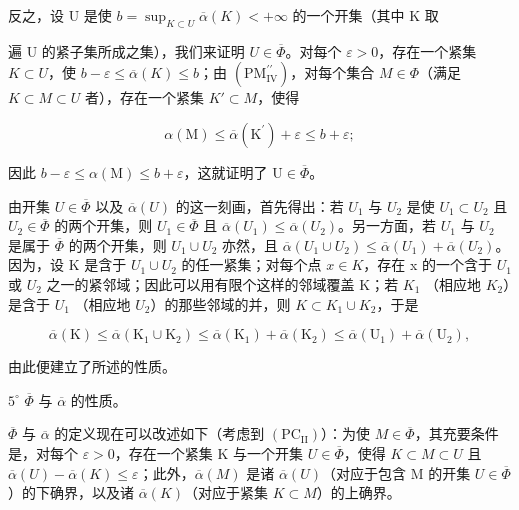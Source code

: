 反之，设 U 是使 \(b = \sup_{K \subset U} \overline{\alpha}(K) < +\infty\) 的一个开集（其中 K 取

遍 U 的紧子集所成之集），我们来证明 \(U \in \overline{\Phi}\)。对每个 \(\varepsilon > 0\)，存在一个紧集 \(K \subset U\)，使 \(b - \varepsilon \leqslant \overline{\alpha}(K) \leqslant b\)；由 \((\mathrm{PM}_{\mathrm{IV}}^{\prime\prime})\)，对每个集合 \(M \in \Phi\)（满足 \(K \subset M \subset U\) 者），存在一个紧集 \(K' \subset M\)，使得

\[
\alpha (\mathrm{M}) \leqslant \overline {{{{\alpha}}}} (\mathrm{K} ^ {\prime}) + \varepsilon \leqslant b + \varepsilon ;
\]

因此 \(b - \varepsilon \leqslant \alpha (\mathrm{M}) \leqslant b + \varepsilon\)，这就证明了 \(\mathrm{U} \in \overline{\Phi}\)。

由开集 \(U \in \overline{\Phi}\) 以及 \(\overline{\alpha}(U)\) 的这一刻画，首先得出：若 \(U_{1}\) 与 \(U_{2}\) 是使 \(U_{1} \subset U_{2}\) 且 \(U_{2} \in \overline{\Phi}\) 的两个开集，则 \(U_{1} \in \overline{\Phi}\) 且 \(\overline{\alpha}(U_{1}) \leqslant \overline{\alpha}(U_{2})\)。另一方面，若 \(U_{1}\) 与 \(U_{2}\) 是属于 \(\overline{\Phi}\) 的两个开集，则 \(U_{1} \cup U_{2}\) 亦然，且 \(\overline{\alpha}(U_{1} \cup U_{2}) \leqslant \overline{\alpha}(U_{1}) + \overline{\alpha}(U_{2})\)。因为，设 K 是含于 \(U_{1} \cup U_{2}\) 的任一紧集；对每个点 \(x \in K\)，存在 x 的一个含于 \(U_{1}\) 或 \(U_{2}\) 之一的紧邻域；因此可以用有限个这样的邻域覆盖 K；若 \(K_{1}\) （相应地 \(K_{2}\)）是含于 \(U_{1}\) （相应地 \(U_{2}\)）的那些邻域的并，则 \(K \subset K_{1} \cup K_{2}\)，于是

\[
\overline {{{{\alpha}}}} (\mathrm{K}) \leqslant \overline {{{{\alpha}}}} (\mathrm{K} _ {1} \cup \mathrm{K} _ {2}) \leqslant \overline {{{{\alpha}}}} (\mathrm{K} _ {1}) + \overline {{{{\alpha}}}} (\mathrm{K} _ {2}) \leqslant \overline {{{{\alpha}}}} (\mathrm{U} _ {1}) + \overline {{{{\alpha}}}} (\mathrm{U} _ {2}),
\]

由此便建立了所述的性质。

\(5^{\circ}\) \(\overline{\Phi}\) 与 \(\overline{\alpha}\) 的性质。

\(\overline{\Phi}\) 与 \(\overline{\alpha}\) 的定义现在可以改述如下（考虑到 \((\mathrm{PC}_{\mathrm{II}})\)）：为使 \(M \in \overline{\Phi}\)，其充要条件是，对每个 \(\varepsilon > 0\)，存在一个紧集 K 与一个开集 \(U \in \overline{\Phi}\)，使得 \(K \subset M \subset U\) 且 \(\overline{\alpha}(U) - \overline{\alpha}(K) \leqslant \varepsilon\)；此外，\(\overline{\alpha}(M)\) 是诸 \(\overline{\alpha}(U)\)（对应于包含 M 的开集 \(U \in \overline{\Phi}\)）的下确界，以及诸 \(\overline{\alpha}(K)\)（对应于紧集 \(K \subset M\)）的上确界。


